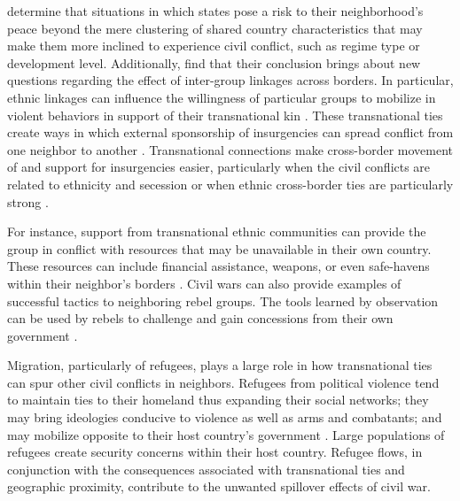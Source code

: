 \documentclass[12pt,letterpaper]{article}
\newtheorem{hyp}{Hypothesis}
\begin{document}
\citet{BuhaugGleditsch2008} determine that situations in which states pose a risk to their neighborhood's peace beyond the mere clustering of shared country characteristics that may make them more inclined to experience civil conflict, such as regime type or development level. Additionally, \citet{BuhaugGleditsch2008} find that their conclusion brings about new questions regarding the effect of inter-group linkages across borders. In particular, ethnic linkages can influence the willingness of particular groups to mobilize in violent behaviors in support of their transnational kin \citep{DavisMoore1997, Saideman1997, Saideman2002, Gleditsch2007}. These transnational ties create ways in which external sponsorship of insurgencies can spread conflict from one neighbor to another \citep{BuhaugGleditsch2008, CedermanGirardinGleditsch2009, Gleditsch2007, Schultz2010}. Transnational connections make cross-border movement of and support for insurgencies easier, particularly when the civil conflicts are related to ethnicity and secession or when ethnic cross-border ties are particularly strong \citep{BuhaugGleditsch2008}. 

For instance, support from transnational ethnic communities can provide the group in conflict with resources that may be unavailable in their own country. These resources can include financial assistance, weapons, or even safe-havens within their neighbor's borders \citep{Gleditsch2007}. Civil wars can also provide examples of successful tactics to neighboring rebel groups. The tools learned by observation can be used by rebels to challenge and gain concessions from their own government \citep{Kuran1998}.

Migration, particularly of refugees, plays a large role in how transnational ties can spur other civil conflicts in neighbors. Refugees from political violence tend to maintain ties to their homeland thus expanding their social networks; they may bring ideologies conducive to violence as well as arms and combatants; and may mobilize opposite to their host country's government \citep{SalehyanGleditsch2006}. Large populations of refugees create security concerns within their host country. Refugee flows, in conjunction with the consequences associated with transnational ties and geographic proximity, contribute to the unwanted spillover effects of civil war. %

\end{document}
